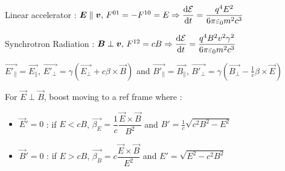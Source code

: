 \columnbreak
{}

\begin{squishlist}
\item Linear accelerator : $ \mbox{\boldmath$E$} \parallel \mbox{\boldmath$v$}, \, F^{01} = -F^{10} = E \Rightarrow \dfrac{\textrm{d} \mathcal{E}}{\textrm{d} t} = \dfrac{q^4E^2}{6\pi\varepsilon_0m^2c^3}$

\item Synchrotron Radiation : $\mbox{\boldmath$B$} \perp \mbox{\boldmath$v$}, \, F^{12} = cB \Rightarrow \dfrac{\textrm{d} \mathcal{E}}{\textrm{d} t} = \dfrac{q^4B^2v^2\gamma^2}{6\pi\varepsilon_0m^2c^3}$
\end{squishlist}

\begin{squishlist}
\item $\vec{E'_{\parallel}}=\vec{E_{\parallel}}$, $\vec{E'_\perp}=\gamma(\vec{E_\perp}+c\beta\times\vec{B})$ and $\vec{B'_{\parallel}}=\vec{B_{\parallel}}$, $\vec{B'_\perp}=\gamma(\vec{B_\perp}-\frac{1}{c}\beta\times\vec{E})$

\item For $\vec{E}\perp\vec{B}$, boost moving to a ref frame where : 
\begin{itemize}
\item $\vec{E}'=0$ : if $E<cB$, $\vec{\beta_E}=\dfrac{1}{c}\dfrac{\vec{E}\times\vec{B}}{B^2}$ and $B'=\frac{1}{c}\sqrt{c^2B^2-E^2}$ 
\item $\vec{B}'=0$ : if $E>cB$, $\vec{\beta_B}=c\dfrac{\vec{E}\times\vec{B}}{E^2}$ and $E'=\sqrt{E^2-c^2B^2}$
\end{itemize}

\end{squishlist}


